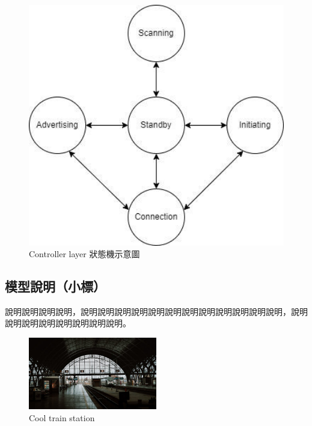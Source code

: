 \begin{ZhChapter}
\begin{figure}[htbp]
    \centering
    \includegraphics[width = 1\textwidth]{image/controller layer 狀態機示意圖.jpg}
    \caption{Controller layer 狀態機示意圖\cite{microchip2023}}
    \label{fig: 廣播頻道與資料頻道示意圖}
\end{figure}


\subsection{模型說明（小標）}

說明說明說明說明，說明說明說明說明說明說明說明說明說明說明說明說明，說明說明說明說明說明說明說明說明。

\begin{figure}[htbp]
    \centering
    \includegraphics[width = 0.5\textwidth]{image/image.jpeg}
    \caption{Cool train station}
    \label{fig: image}
\end{figure}

\end{ZhChapter}